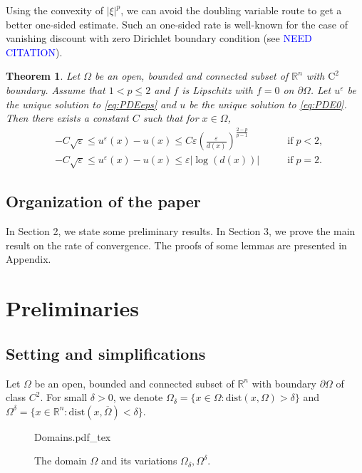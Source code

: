 \documentclass[12pt,reqno]{amsart}
\numberwithin{figure}{section}
\theoremstyle{plain}
\newtheorem{thm}{Theorem}[section]
\theoremstyle{remark}
\numberwithin{equation}{section}
\newcommand{\R}{\mathbb{R}}
\newcommand{\incfig}[1]{%
    \def\svgwidth{\columnwidth}
    {#1.pdf_tex}
}
\begin{document}
Using the convexity of $|\xi|^p$, we can avoid the doubling variable route to get a better one-sided estimate. Such an one-sided rate is well-known for the case of vanishing discount with zero Dirichlet boundary condition (see \textcolor{blue}{NEED CITATION}).

\begin{thm}\label{main_thm2} Let $\Omega$ be an open, bounded and connected subset of $\R^n$ with $\mathrm{C}^2$ boundary. Assume that $1 < p\leq 2$ and $f$ is Lipschitz with $f = 0$ on $\partial\Omega$. Let $u^\varepsilon$ be the unique solution to \eqref{eq:PDEeps} and $u$ be the unique solution to \eqref{eq:PDE0}. Then there exists a constant $C$ such that for $x\in \Omega$,
\begin{align*}
    &-C\sqrt{\varepsilon}\leq  u^\varepsilon(x) - u(x)\leq  C\varepsilon \left(\frac{\varepsilon}{d(x)}\right)^{\frac{2-p}{p-1}} &\qquad\text{if}\; p < 2,\\
    &-C\sqrt{\varepsilon}\leq  u^\varepsilon(x) - u(x)\leq  \varepsilon|\log(d(x))| &\qquad\text{if}\; p = 2.
\end{align*}
\end{thm}



\subsection*{Organization of the paper} In Section 2, we state some preliminary results. In Section 3, we prove the main result on the rate of convergence. The proofs of some lemmas are presented in Appendix.

\section{Preliminaries}\label{sec:prelim} 
\subsection{Setting and simplifications} Let $\Omega$ be an open, bounded and connected subset of $\mathbb{R}^n$ with boundary $\partial\Omega$ of class $C^2$. For small $\delta>0$, we denote $\Omega_\delta = \{x\in \Omega: \mathrm{dist}(x,\Omega) > \delta\}$ and $\Omega^\delta = \{x\in \mathbb{R}^n: \mathrm{dist}(x,\overline{\Omega}) < \delta\}$. 
\begin{figure}[ht]
    \centering
    \def\svgwidth{0.35\columnwidth}
    {Domains.pdf_tex}
    \caption{The domain $\Omega$ and its variations $\Omega_\delta, \Omega^\delta$.}
    \label{fig:Domains}
\end{figure}
\end{document}
